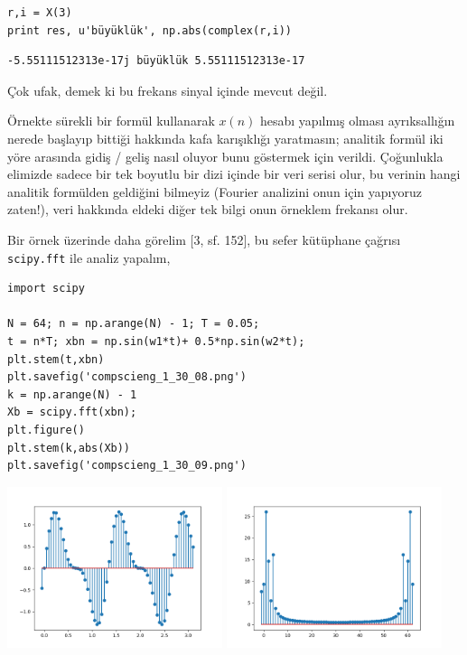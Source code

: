 \documentclass[12pt,fleqn]{article}\usepackage{../../common}
\begin{document}
\begin{verbatim}
r,i = X(3)
print res, u'büyüklük', np.abs(complex(r,i))
\end{verbatim}

\begin{verbatim}
-5.55111512313e-17j büyüklük 5.55111512313e-17
\end{verbatim}

Çok ufak, demek ki bu frekans sinyal içinde mevcut değil.

Örnekte sürekli bir formül kullanarak $x(n)$ hesabı yapılmış olması
ayrıksallığın nerede başlayıp bittiği hakkında kafa karışıklığı yaratmasın;
analitik formül iki yöre arasında gidiş / geliş nasıl oluyor bunu göstermek
için verildi. Çoğunlukla elimizde sadece bir tek boyutlu bir dizi içinde
bir veri serisi olur, bu verinin hangi analitik formülden geldiğini
bilmeyiz (Fourier analizini onun için yapıyoruz zaten!), veri hakkında
eldeki diğer tek bilgi onun örneklem frekansı olur.

Bir örnek üzerinde daha görelim [3, sf. 152], bu sefer kütüphane çağrısı
\verb!scipy.fft! ile analiz yapalım,

\begin{verbatim}
import scipy

N = 64; n = np.arange(N) - 1; T = 0.05;
t = n*T; xbn = np.sin(w1*t)+ 0.5*np.sin(w2*t);
plt.stem(t,xbn)
plt.savefig('compscieng_1_30_08.png')
k = np.arange(N) - 1
Xb = scipy.fft(xbn);
plt.figure()
plt.stem(k,abs(Xb))
plt.savefig('compscieng_1_30_09.png')
\end{verbatim}

\includegraphics[width=17em]{compscieng_1_30_08.png}
\includegraphics[width=17em]{compscieng_1_30_09.png}
\end{document}

